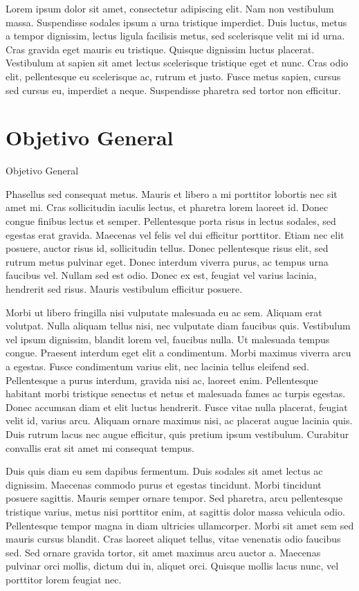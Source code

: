 Lorem ipsum dolor sit amet, consectetur adipiscing elit. Nam non vestibulum massa. Suspendisse sodales ipsum a urna tristique imperdiet. Duis luctus, metus a tempor dignissim, lectus ligula facilisis metus, sed scelerisque velit mi id urna. Cras gravida eget mauris eu tristique. Quisque dignissim luctus placerat. Vestibulum at sapien sit amet lectus scelerisque tristique eget et nunc. Cras odio elit, pellentesque eu scelerisque ac, rutrum et justo. Fusce metus sapien, cursus sed cursus eu, imperdiet a neque. Suspendisse pharetra sed tortor non efficitur.
\section{Objetivo General}
Objetivo General

Phasellus sed consequat metus. Mauris et libero a mi porttitor lobortis nec sit
amet mi. Cras sollicitudin iaculis lectus, et pharetra lorem laoreet id. Donec
congue finibus lectus et semper. Pellentesque porta risus in lectus sodales, sed
egestas erat gravida. Maecenas vel felis vel dui efficitur porttitor. Etiam nec
elit posuere, auctor risus id, sollicitudin tellus. Donec pellentesque risus
elit, sed rutrum metus pulvinar eget. Donec interdum viverra purus, ac tempus
urna faucibus vel. Nullam sed est odio. Donec ex est, feugiat vel varius
lacinia, hendrerit sed risus. Mauris vestibulum efficitur posuere.

Morbi ut libero fringilla nisi vulputate malesuada eu ac sem. Aliquam
erat volutpat. Nulla aliquam tellus nisi, nec vulputate diam faucibus
quis. Vestibulum vel ipsum dignissim, blandit lorem vel, faucibus nulla.
Ut malesuada tempus congue. Praesent interdum eget elit a condimentum.
Morbi maximus viverra arcu a egestas. Fusce condimentum varius elit,
nec lacinia tellus eleifend sed. Pellentesque a purus interdum, gravida
nisi ac, laoreet enim. Pellentesque habitant morbi tristique senectus
et netus et malesuada fames ac turpis egestas. Donec accumsan diam et
elit luctus hendrerit. Fusce vitae nulla placerat, feugiat velit id,
varius arcu. Aliquam ornare maximus nisi, ac placerat augue lacinia
quis. Duis rutrum lacus nec augue efficitur, quis pretium ipsum
vestibulum. Curabitur convallis erat sit amet mi consequat tempus.

Duis quis diam eu sem dapibus fermentum. Duis sodales sit amet lectus
ac dignissim. Maecenas commodo purus et egestas tincidunt. Morbi tincidunt
 posuere sagittis. Mauris semper ornare tempor. Sed pharetra, arcu pellentesque
 tristique varius, metus nisi porttitor enim, at sagittis dolor massa vehicula
 odio. Pellentesque tempor magna in diam ultricies ullamcorper. Morbi sit amet
 sem sed mauris cursus blandit. Cras laoreet aliquet tellus, vitae venenatis
 odio faucibus sed. Sed ornare gravida tortor, sit amet maximus arcu auctor
 a. Maecenas pulvinar orci mollis, dictum dui in, aliquet orci. Quisque mollis
 lacus nunc, vel porttitor lorem feugiat nec.

